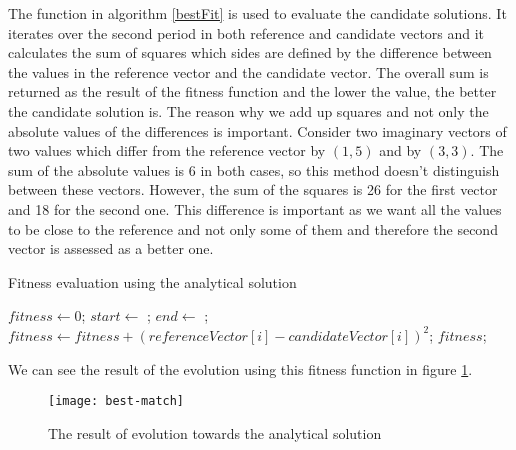     The function in algorithm \ref{bestFit} is used to evaluate the candidate solutions. It iterates over the second period in both reference and candidate vectors and it calculates the sum of squares which sides are defined by the difference between the values in the reference vector and the candidate vector. The overall sum is returned as the result of the fitness function and the lower the value, the better the candidate solution is. The reason why we add up squares and not only the absolute values of the differences is important. Consider two imaginary vectors of two values which differ from the reference vector by $(1, 5)$ and by $(3,3)$. The sum of the absolute values is 6 in both cases, so this method doesn't distinguish between these vectors. However, the sum of the squares is 26 for the first vector and 18 for the second one. This difference is important as we want all the values to be close to the reference and not only some of them and therefore the second vector is assessed as a better one.

\begin{algorithm}
\caption{Fitness evaluation using the analytical solution}
\label{bestFit}
\begin{algorithmic}[1]
        \State $fitness \gets 0$;
        \State $start \gets$ ;
        \State $end \gets$ ;
            \State $fitness \gets fitness + (referenceVector[i] - candidateVector[i])^2$;
        \EndFor
        \State \Return $fitness$;
     \EndFunction
\end{algorithmic}
\end{algorithm}

We can see the result of the evolution using this fitness function in figure \ref{best-match}.

\begin{figure}[H]
    \centerline{\texttt{[image: best-match]}\label{best-match}}
    \caption{The result of evolution towards the analytical solution}
\end{figure}

